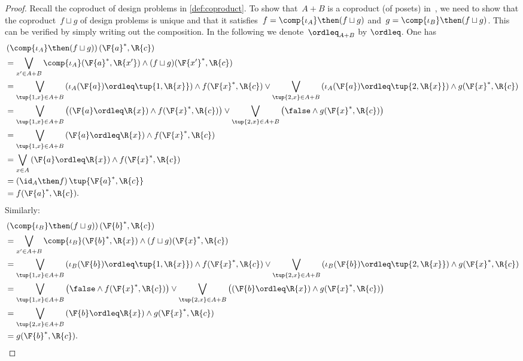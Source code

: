 \begin{proof}
    Recall the coproduct of design problems in \cref{def:coproduct}. To show that~$A+B$ is a coproduct (of posets) in~\DP, we need to show that the coproduct~$f \sqcup g$ of design problems is unique and that it satisfies~$f = \comp{\iota_A} \then (f \sqcup g)$ and~$g = \comp{\iota_B} \then (f \sqcup g)$. This can be verified by simply writing out the composition. In the following we denote~$\ordleq_{A+B}$ by $\ordleq$. One has
    \begin{equation}
        \begin{aligned}
            &\left(\comp{\iota_A}\then (f\sqcup g)\right)(\F{a}^*,\R{c})\\&=\bigvee_{x' \in A+B}\comp{\iota_A}(\F{a}^*,\R{x'})\wedge (f\sqcup g)(\F{x'}^*,\R{c})\\
            &=\bigvee_{\tup{1,x} \in A+B}
            \left(\iota_A(\F{a})\ordleq\tup{1,\R{x}}\right)\wedge  f(\F{x}^*,\R{c})  \vee \bigvee_{\tup{2,x} \in A+B}
            \left(\iota_A(\F{a})\ordleq \tup{2,\R{x}}\right)\wedge  g(\F{x}^*,\R{c})\\
            &=\bigvee_{\tup{1,x} \in A+B}
            \left( \left(\F{a}\ordleq \R{x}\right) \wedge  f(\F{x}^*,\R{c})\right) \vee \bigvee_{\tup{2,x} \in A+B}
            \left( \false \wedge  g(\F{x}^*,\R{c}) \right)\\
            &=\bigvee_{\tup{1,x} \in A+B} \left(\F{a}\ordleq \R{x}\right) \wedge  f(\F{x}^*,\R{c})\\
            &=\bigvee_{x\in A}\left( \F{a}\ordleq \R{x}\right) \wedge f(\F{x}^*,\R{c})\\
            &=\left( \id_A \then f\right)\tup{\F{a}^*,\R{c}}\\
            &=f(\F{a}^*,\R{c}).
        \end{aligned}
    \end{equation}
    Similarly:
    \begin{equation}
        \begin{aligned}
            &\left(\comp{\iota_B}\then (f\sqcup g)\right)(\F{b}^*,\R{c})\\&=\bigvee_{x' \in A+B}\comp{\iota_B}(\F{b}^*,\R{x})\wedge (f\sqcup g)(\F{x}^*,\R{c})\\
            &=\bigvee_{\tup{1,x} \in A+B}
            \left(\iota_B(\F{b})\ordleq\tup{1,\R{x}}\right)\wedge  f(\F{x}^*,\R{c})  \vee \bigvee_{\tup{2,x} \in A+B}
            \left(\iota_B(\F{b})\ordleq \tup{2,\R{x}}\right)\wedge  g(\F{x}^*,\R{c})\\
            &=\bigvee_{\tup{1,x} \in A+B}
            \left(\false \wedge  f(\F{x}^*,\R{c})\right) \vee \bigvee_{\tup{2,x} \in A+B}
            \left(\left(\F{b}\ordleq \R{x}\right) \wedge  g(\F{x}^*,\R{c}) \right)\\
            &=\bigvee_{\tup{2,x} \in A+B} \left(\F{b}\ordleq \R{x}\right) \wedge  g(\F{x}^*,\R{c})\\
            &=g(\F{b}^*,\R{c}).
        \end{aligned}
    \end{equation}


\end{proof}
